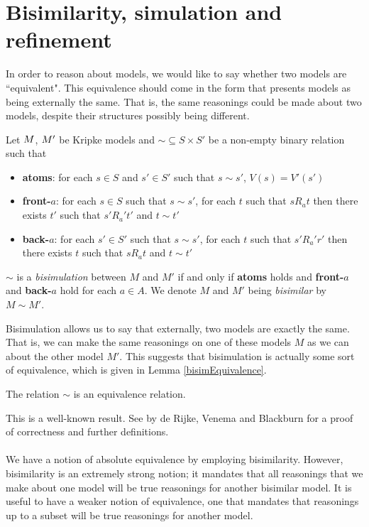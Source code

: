 \section{Bisimilarity, simulation and refinement} \label{subsec:prelim:bisimulation}

In order to reason about models, we would like to say whether two models are ``equivalent".
This equivalence should come in the form that presents models as being externally the same.
That is, the same reasonings could be made about two models, despite their structures possibly being
different.

\begin{defn} \label{bisimKripke}
	Let $M$, $M'$ be Kripke models and $\sim \subseteq S \times S'$ be a non-empty binary
	relation such that
	\begin{itemize}
		\item {\bf atoms}: for each $s \in S$ and $s' \in S'$ such that $s \sim s'$, $V(s) = V'(s')$
		\item {\bf front-$a$}: for each $s \in S$ such that $s \sim s'$, for each $t$ such that
		$s R_a t$ then there exists $t'$ such that $s' R_a' t'$ and $t \sim t'$
		\item {\bf back-$a$}: for each $s' \in S'$ such that $s \sim s'$, for each $t$ such that
		$s' R_a' r'$ then there exists $t$ such that $s R_a t$ and $t \sim t'$
	\end{itemize}
	$\sim$ is a {\em bisimulation} between $M$ and $M'$ if and only if {\bf atoms} holds and {\bf front-$a$}
	and {\bf back-$a$} hold for each $a \in A$.
	We denote $M$ and $M'$ being {\em bisimilar} by $M \sim M'$.
\end{defn}

Bisimulation allows us to say that externally, two models are exactly the same.
That is, we can make the same reasonings on one of these models $M$ as we can about the other model
$M'$.
This suggests that bisimulation is actually some sort of equivalence, which is given in Lemma
\ref{bisimEquivalence}.

\begin{lemma} \label{bisimEquivalence}
	The relation $\sim$ is an equivalence relation.
\end{lemma}

This is a well-known result.
See \cite{blackburn2002modal} by de Rijke, Venema and Blackburn for a proof of correctness and
further definitions.\\
\\
We have a notion of absolute equivalence by employing bisimilarity.
However, bisimilarity is an extremely strong notion; it mandates that all reasonings that we make
about one model will be true reasonings for another bisimilar model.
It is useful to have a weaker notion of equivalence, one that mandates that reasonings up to a
subset will be true reasonings for another model.

